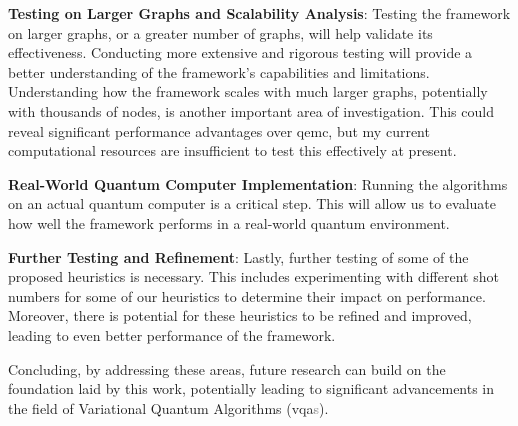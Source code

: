 \noindent\textbf{Testing on Larger Graphs and Scalability Analysis}: Testing the framework on larger graphs, or a greater number of graphs, will help validate its effectiveness. Conducting more extensive and rigorous testing will provide a better understanding of the framework's capabilities and limitations. Understanding how the framework scales with much larger graphs, potentially with thousands of nodes, is another important area of investigation. This could reveal significant performance advantages over \acrshort{qemc}, but my current computational resources are insufficient to test this effectively at present.
\vspace{5mm}

\noindent\textbf{Real-World Quantum Computer Implementation}: Running the algorithms on an actual quantum computer is a critical step. This will allow us to evaluate how well the framework performs in a real-world quantum environment.
\vspace{5mm}

\noindent\textbf{Further Testing and Refinement}: Lastly, further testing of some of the proposed heuristics is necessary. This includes experimenting with different shot numbers for some of our heuristics to determine their impact on performance. Moreover, there is potential for these heuristics to be refined and improved, leading to even better performance of the framework.

Concluding, by addressing these areas, future research can build on the foundation laid by this work, potentially leading to significant advancements in the field of Variational Quantum Algorithms (\acrshort{vqa}\textcolor{gray}{s}).


